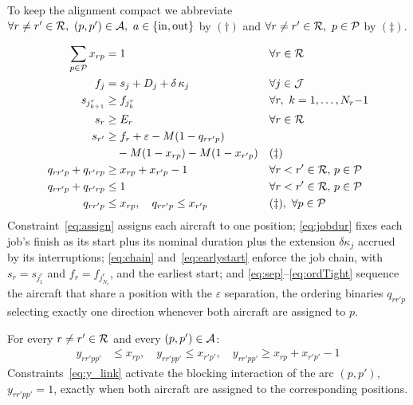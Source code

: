 To keep the alignment compact we abbreviate
$\forall r \ne r' \in \mathcal{R},\ (p,p') \in \mathcal{A},\ a \in
\{\mathrm{in},\mathrm{out}\}$ by $(\dagger)$ and
$\forall r \ne r' \in \mathcal{R},\ p \in \mathcal{P}$ by $(\ddagger)$.

\begin{align}
  \sum_{p \in \mathcal{P}} x_{rp} &= 1
    && \forall r \in \mathcal{R} \label{eq:assign}\\
  f_j &= s_j + D_j + \delta\, \kappa_j
    && \forall j \in \mathcal{J} \label{eq:jobdur}\\
  s_{j^r_{k+1}} &\ge f_{j^r_k}
    && \forall r,\ k = 1, \ldots, N_r{-}1 \label{eq:chain}\\
  s_r &\ge E_r
    && \forall r \in \mathcal{R} \label{eq:earlystart}\\
  s_{r'} &\ge f_r + \varepsilon - M(1 - q_{rr'p}) \notag\\
         &\quad - M(1 - x_{rp}) - M(1 - x_{r'p})
    && (\ddagger) \label{eq:sep}\\
  q_{rr'p} + q_{r'rp} &\ge x_{rp} + x_{r'p} - 1
    && \forall r < r' \in \mathcal{R},\, p \in \mathcal{P} \label{eq:ordLB}\\
  q_{rr'p} + q_{r'rp} &\le 1
    && \forall r < r' \in \mathcal{R},\, p \in \mathcal{P} \label{eq:ordUB}\\
  q_{rr'p} &\le x_{rp},\quad q_{rr'p} \le x_{r'p}
    && (\ddagger),\ \forall p \in \mathcal{P} \label{eq:ordTight}
\end{align}
Constraint~\eqref{eq:assign} assigns each aircraft to one position;
\eqref{eq:jobdur} fixes each job's finish as its start plus its nominal
duration plus the extension $\delta\kappa_j$ accrued by its
interruptions; \eqref{eq:chain} and~\eqref{eq:earlystart} enforce the
job chain, with $s_r = s_{j^r_1}$ and $f_r = f_{j^r_{N_r}}$, and the
earliest start; and \eqref{eq:sep}--\eqref{eq:ordTight} sequence the
aircraft that share a position with the $\varepsilon$ separation, the
ordering binaries $q_{rr'p}$ selecting exactly one direction whenever
both aircraft are assigned to $p$.

For every $r \ne r' \in \mathcal{R}$ and every $(p, p') \in \mathcal{A}$:
\begin{align}
  y_{rr'pp'} &\le x_{rp},\quad
  y_{rr'pp'} \le x_{r'p'},\quad
  y_{rr'pp'} \ge x_{rp} + x_{r'p'} - 1
    \label{eq:y_link}
\end{align}
Constraints~\eqref{eq:y_link} activate the blocking interaction of the
arc $(p, p')$, $y_{rr'pp'} = 1$, exactly when both aircraft are assigned
to the corresponding positions.

